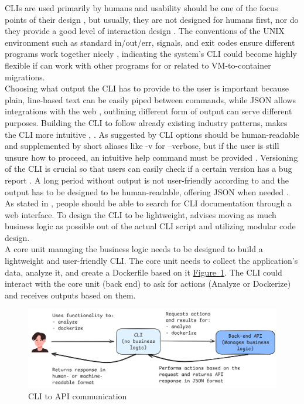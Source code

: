 \documentclass[twocolumn]{article}
\newcommand{\FigRef}[1]{\hyperref[#1]{Figure~\ref{#1}}}
\begin{document}
CLIs are used primarily by humans and usability should be one of the focus points of their design \cite{Newton-2016}, but usually, they are not designed for humans first, nor do they provide a good level of interaction design \cite{Tiedemann-2023}. The conventions of the UNIX environment such as standard in/out/err, signals, and exit codes ensure different programs work together nicely \cite{Tiedemann-2023}, indicating the system's CLI could become highly flexible if can work with other programs for or related to VM-to-container migrations. \\

Choosing what output the CLI has to provide to the user is important because plain, line-based text can be easily piped between commands, while JSON allows integrations with the web \cite{Tiedemann-2023}, outlining different form of output can serve different purposes. Building the CLI to follow already existing industry patterns, makes the CLI more intuitive \cite{Tiedemann-2023}, \cite{Newton-2016}. As suggested by \cite{Newton-2016} CLI options should be human-readable and supplemented by short aliases like -v for –verbose, but if the user is still unsure how to proceed, an intuitive help command must be provided \cite{Salesforce-2024}. Versioning of the CLI is crucial so that users can easily check if a certain version has a bug report \cite{Salesforce-2024}. A long period without output is not user-friendly according to \cite{Salesforce-2024} and the output has to be designed to be human-readable, offering JSON when needed \cite{PrasadEtAl-2024}. As stated in \cite{Tiedemann-2023}, people should be able to search for CLI documentation through a web interface. To design the CLI to be lightweight, \cite{Salesforce-2024} advises moving as much business logic as possible out of the actual CLI script and utilizing modular code design. \\

A core unit managing the business logic needs to be designed to build a lightweight and user-friendly CLI. The core unit needs to collect the application’s data, analyze it, and create a Dockerfile based on it \FigRef{fig:cli-api-communication}. The CLI could interact with the core unit (back end) to ask for actions (Analyze or Dockerize) and receives outputs based on them.

\begin{figure}[H]
    \centering
    \includegraphics[width=\linewidth]{images/cli-api-communication.png}
    \caption{CLI to API communication}
    \label{fig:cli-api-communication}
\end{figure}
\end{document}

